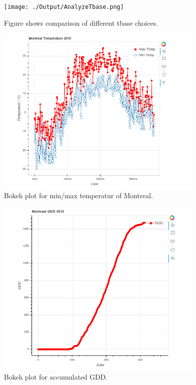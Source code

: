 \documentclass[12pt]{article}
\begin{document}
	\begin{figure}[!htbp]
		\centering
		\texttt{[image: ./Output/AnalyzeTbase.png]} 
		\caption{\scriptsize Figure shows comparison of different tbase choices.}\label{analyzeTbase}		  
	\end{figure}

	\begin{figure}[!htbp]
		\centering
		\includegraphics[width=0.9\textwidth]{./Report/tempMontreal.png} 
		\caption{\scriptsize Bokeh plot for min/max temperatur of Montreal.}\label{bokehTempMontreal}		  
	\end{figure}
	
	\begin{figure}[!htbp]
		\centering
		\includegraphics[width=0.9\textwidth]{./Report/accGDD.png} 
		\caption{\scriptsize Bokeh plot for accumulated GDD.}\label{bokehAccGDD}		  
	\end{figure}
	
\end{document}
